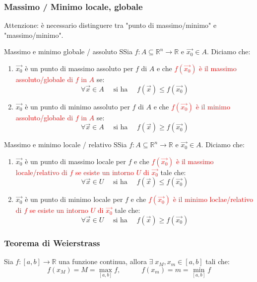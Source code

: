 \documentclass{article}  %
\begin{document}
\subsubsection{Massimo / Minimo locale, globale}
Attenzione: è necessario distinguere tra "punto di massimo/minimo" e "massimo/minimo".
\begin{definition}{Massimo e minimo globale / assoluto}
	SSia $f: A \subseteq \mathbb{R}^n \to \mathbb{R}$ e $\vec{x_0} \in A$.
	Diciamo che:
	\begin{enumerate}
		\item $\vec{x_0}$ è un punto di massimo assoluto per $f$ di $A$ e che \textcolor{red}{$f(\vec{x_0})$ è il massimo assoluto/globale di $f$ in $A$} se:
		      \[
			      \forall{\vec{x}} \in A \quad \text{ si ha } \quad f(\vec{x}) \leq f(\vec{x_0})
		      \]
		\item $\vec{x_0}$ è un punto di minimo assoluto per $f$ di $A$ e che \textcolor{red}{$f(\vec{x_0})$ è il minimo assoluto/globale di $f$ in $A$} se:
		      \[
			      \forall{\vec{x}} \in A \quad \text{ si ha } \quad f(\vec{x}) \geq f(\vec{x_0})
		      \]
	\end{enumerate}
\end{definition}
\begin{definition}{Massimo e minimo locale / relativo}
	SSia $f: A \subseteq \mathbb{R}^n \to \mathbb{R}$ e $\vec{x_0} \in A$.
	Diciamo che:
	\begin{enumerate}
		\item $\vec{x_0}$ è un punto di massimo locale per $f$ e che \textcolor{red}{$f(\vec{x_0})$ è il massimo locale/relativo di $f$ se esiste un intorno $U$ di $\vec{x_0}$} tale che:
		      \[
			      \forall{\vec{x}} \in U \quad \text{ si ha } \quad f(\vec{x}) \leq f(\vec{x_0})
		      \]
		\item $\vec{x_0}$ è un punto di minimo locale per $f$ e che \textcolor{red}{$f(\vec{x_0})$ è il minimo loclae/relativo di $f$ se esiste un intorno $U$ di $\vec{x_0}$} tale che:
		      \[
			      \forall{\vec{x}} \in U \quad \text{ si ha } \quad f(\vec{x}) \geq f(\vec{x_0})
		      \]
	\end{enumerate}
\end{definition}
\subsubsection{Teorema di Weierstrass}
\begin{osservazioni}
	Sia $f:[a,b] \to \mathbb{R}$ una funzione continua, allora $\exists \; x_M,x_m \in [a,b]$ tali che:
	\[
		f(x_M)=M=\underset{[a,b]}{\max } f, \quad \quad \quad f(x_m)=m=\underset{[a,b]}{\min } f
	\]
\end{osservazioni}
\end{document}
